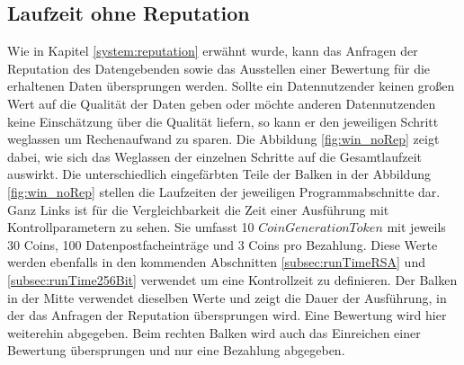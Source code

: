 \documentclass{scrreprt}
\begin{document}
\subsection{Laufzeit ohne Reputation}
Wie in Kapitel \ref{system:reputation} erwähnt wurde, kann das Anfragen der Reputation des Datengebenden sowie das Ausstellen einer Bewertung für die erhaltenen Daten übersprungen werden. Sollte ein Datennutzender keinen großen Wert auf die Qualität der Daten geben oder möchte anderen Datennutzenden keine Einschätzung über die Qualität liefern, so kann er den jeweiligen Schritt weglassen um Rechenaufwand zu sparen. Die Abbildung \ref{fig:win_noRep} zeigt dabei, wie sich das Weglassen der einzelnen Schritte auf die Gesamtlaufzeit auswirkt.
Die unterschiedlich eingefärbten Teile der Balken in der Abbildung \ref{fig:win_noRep} stellen die Laufzeiten der jeweiligen Programmabschnitte dar. Ganz Links ist für die Vergleichbarkeit die Zeit einer Ausführung mit Kontrollparametern zu sehen. Sie umfasst 10 $CoinGenerationToken$ mit jeweils 30 Coins, 100 Datenpostfacheinträge und 3 Coins pro Bezahlung. Diese Werte werden ebenfalls in den kommenden Abschnitten \ref{subsec:runTimeRSA} und \ref{subsec:runTime256Bit} verwendet um eine Kontrollzeit zu definieren. Der Balken in der Mitte verwendet dieselben Werte und zeigt die Dauer der Ausführung, in der das Anfragen der Reputation übersprungen wird. Eine Bewertung wird hier weiterehin abgegeben. Beim rechten Balken wird auch das Einreichen einer Bewertung übersprungen und nur eine Bezahlung abgegeben.\\
\end{document}

